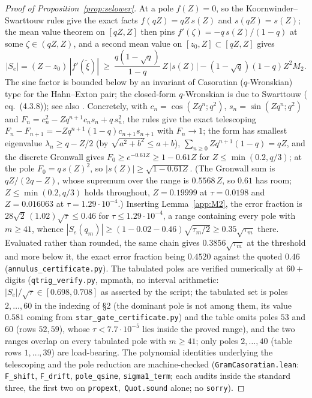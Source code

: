 \documentclass[11pt]{article}
\theoremstyle{plain}
\theoremstyle{definition}
\theoremstyle{remark}
\begin{document}
\begin{proof}[Proof of Proposition~\ref{prop:selower}]
At a pole $f(Z)=0$, so the Koornwinder--Swarttouw rules give the exact facts $f(qZ)=qZ\,s(Z)$ and
$s(qZ)=s(Z)$; the mean value theorem on $[qZ,Z]$ then pins
$f'(\zeta)=-q\,s(Z)/(1-q)$ at some $\zeta\in(qZ,Z)$, and a second mean value on
$[z_0,Z]\subset[qZ,Z]$ gives
\[
 |S_e|=(Z-z_0)\,|f'(\tilde\xi)|\ \ge\ \frac{q(1-\sqrt q)}{1-q}\,Z\,|s(Z)|-(1-\sqrt q)(1-q)Z^2M_2 .
\]
The sine factor is bounded below by an invariant of Casoratian ($q$-Wronskian) type for the
Hahn--Exton pair; the closed-form $q$-Wronskian is due to Swarttouw \cite{Swarttouw1992} (
eq.~(4.3.8)); see also \cite[eq.~(4.21)]{Daalhuis1994}. Concretely, with $c_n=\cos(Zq^n;q^2)$, $s_n=\sin(Zq^n;q^2)$
and $F_n=c_n^2-Zq^{n+1}c_ns_n+q\,s_n^2$, the rules give the exact telescoping
$F_n-F_{n+1}=-Zq^{n+1}(1-q)c_{n+1}s_{n+1}$ with $F_n\to1$; the form has smallest eigenvalue
$\lambda_n\ge q-Z/2$ (by $\sqrt{a^2+b^2}\le a+b$), $\sum_{n\ge0}Zq^{n+1}(1-q)=qZ$, and the discrete
Gronwall gives $F_0\ge e^{-0.61Z}\ge1-0.61Z$ for $Z\le\min(0.2,q/3)$; at the pole $F_0=q\,s(Z)^2$,
so $|s(Z)|\ge\sqrt{1-0.61Z}$. (The Gronwall sum is $qZ/(2q-Z)$, whose supremum over the range is
$0.5568\,Z$, so $0.61$ has room; $Z\le\min(0.2,q/3)$ holds throughout, $Z=0.19999$ at
$\tau=0.0198$ and $Z=0.016063$ at $\tau=1.29\cdot10^{-4}$.) Inserting Lemma~\ref{app:M2}, the error fraction is
$28\sqrt2\,(1.02)\sqrt\tau\le0.46$ for $\tau\le1.29\cdot10^{-4}$, a range containing every pole with
$m\ge41$, whence $|S_e(q_m)|\ge(1-0.02-0.46)\sqrt{\tau_m/2}\ge0.35\sqrt{\tau_m}$ there. Evaluated
rather than rounded, the same chain gives $0.3856\sqrt{\tau_m}$ at the threshold and more below it,
the exact error fraction being $0.4520$ against the quoted $0.46$
(\texttt{annulus\_certificate.py}). The tabulated poles are verified numerically at $60+$ digits
(\texttt{qtrig\_verify.py}, mpmath, no interval arithmetic:
$|S_e|/\sqrt\tau\in[0.698,0.708]$ as asserted by the script; the tabulated set is poles
$2,\dots,60$ in the indexing of \S2 (the dominant pole is not among them, its value $0.581$
coming from \texttt{star\_gate\_certificate.py}) and the table omits poles $53$ and $60$ (rows
$52,59$), whose $\tau<7.7\cdot10^{-5}$ lies inside the proved range), and the two ranges overlap on
every tabulated pole with $m\ge41$; only poles $2,\dots,40$ (table rows $1,\dots,39$) are
load-bearing.
The polynomial identities underlying the telescoping and the pole reduction are machine-checked
(\texttt{GramCasoratian.lean}: \texttt{F\_shift}, \texttt{F\_drift}, \texttt{pole\_qsine},
\texttt{sigma1\_term}; each audits inside the standard three, the first two on
\texttt{propext},~\texttt{Quot.sound} alone; no \texttt{sorry}).
\end{proof}
\end{document}
